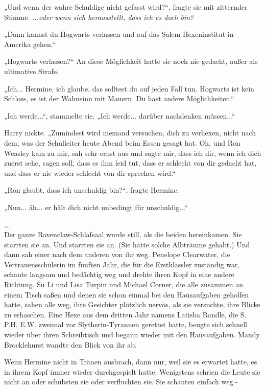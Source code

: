 {„Und wenn der wahre Schuldige nicht gefasst wird?“, fragte sie mit zitternder Stimme. \emph{...oder wenn sich herausstellt, dass ich es doch bin?}

„Dann kannst du Hogwarts verlassen und auf das Salem Hexeninstitut in Amerika gehen.“

„Hogwarts verlassen?“ An diese Möglichkeit hatte sie noch nie gedacht, außer als ultimative Strafe.

„Ich... Hermine, ich glaube, das solltest du auf jeden Fall tun. Hogwarts ist kein Schloss, es ist der Wahnsinn mit Mauern. Du hast andere Möglichkeiten.“

„Ich werde...“, stammelte sie. „Ich werde... darüber nachdenken müssen...“

Harry nickte. „Zumindest wird niemand versuchen, dich zu verhexen, nicht nach dem, was der Schulleiter heute Abend beim Essen gesagt hat. Oh, und Ron Weasley kam zu mir, sah sehr ernst aus und sagte mir, dass ich dir, wenn ich dich zuerst sehe, sagen soll, dass es ihm leid tut, dass er schlecht von dir gedacht hat, und dass er nie wieder schlecht von dir sprechen wird.“

„Ron glaubt, dass ich unschuldig bin?“, fragte Hermine.

„Nun... äh... er hält dich nicht unbedingt für unschuldig...“

….\\ Der ganze Ravenclaw-Schlafsaal wurde still, als die beiden hereinkamen. Sie starrten sie an. Und starrten sie an. (Sie hatte solche Albträume gehabt.) Und dann sah einer nach dem anderen von ihr weg. Penelope Clearwater, die Vertrauensschülerin im fünften Jahr, die für die Erstklässler zuständig war, schaute langsam und bedächtig weg und drehte ihren Kopf in eine andere Richtung. Su Li und Lisa Turpin und Michael Corner, die alle zusammen an einem Tisch saßen und denen sie schon einmal bei den Hausaufgaben geholfen hatte, sahen alle weg, ihre Gesichter plötzlich nervös, als sie versuchte, ihre Blicke zu erhaschen. Eine Hexe aus dem dritten Jahr namens Latisha Randle, die S. P.H. E.W. zweimal vor Slytherin-Tyrannen gerettet hatte, beugte sich schnell wieder über ihren Schreibtisch und begann wieder mit den Hausaufgaben. Mandy Brocklehurst wandte den Blick von ihr ab.

Wenn Hermine nicht in Tränen ausbrach, dann nur, weil sie es erwartet hatte, es in ihrem Kopf immer wieder durchgespielt hatte. Wenigstens schrien die Leute sie nicht an oder schubsten sie oder verfluchten sie. Sie schauten einfach weg -

}
